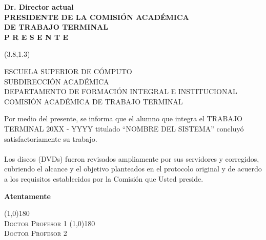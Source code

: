 \documentclass[11pt]{brownletter}
\date{México, D.F. a 8 de Enero de 2016\\} %
\begin{document}
\begin{letter}{\normalsize{\textbf{ Dr. Director actual\\
		PRESIDENTE DE LA COMISIÓN ACADÉMICA \\ DE TRABAJO TERMINAL\\
		P R E S E N T E}}}

\opening{ }
\begin{textblock}{8}(3.8,1.3)
\begin{center}
	ESCUELA SUPERIOR DE CÓMPUTO \\
SUBDIRECCIÓN ACADÉMICA \\
DEPARTAMENTO DE FORMACIÓN INTEGRAL E
INSTITUCIONAL\\
COMISIÓN ACADÉMICA DE TRABAJO TERMINAL
\end{center}
\end{textblock}
 \vspace*{1cm}

Por medio del presente, se informa que el alumno que integra el TRABAJO
TERMINAL 20XX - YYYY titulado “NOMBRE DEL SISTEMA” concluyó satisfactoriamente su trabajo. \\\\
Los discos (DVDs) fueron revisados ampliamente por sus servidores y corregidos, cubriendo el alcance y el objetivo planteados en el protocolo original y de acuerdo a los requisitos establecidos por la Comisión que Usted preside.
\vspace*{1.5cm}
\closing{\textbf{Atentamente}}
\vspace*{4.5cm}
\begin{center}
		\begin{multicols}{2}
		\line(1,0){180}\\		
		\textsc{Doctor Profesor 1} \columnbreak \vfill
		\line(1,0){180}\\
	\textsc{Doctor Profesor 2} \\
	\end{multicols}
\end{center}
 
\end{letter}
\end{document}
